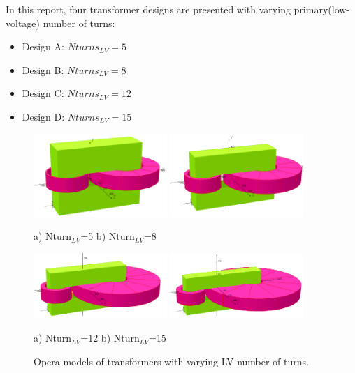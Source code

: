 \documentclass[a4paper, 11pt]{article} %
\begin{document}
In this report, four transformer designs are presented with varying primary(low-voltage) number of turns:

\begin{itemize}
\item Design A: $Nturns_{LV}=5$
\item Design B: $Nturns_{LV}=8$
\item Design C: $Nturns_{LV}=12$
\item Design D: $Nturns_{LV}=15$
\end{itemize}

\begin{figure}[]
  \centering
    \includegraphics[width=0.45\textwidth]{Np5}
    \includegraphics[width=0.45\textwidth]{Np8_pers}

a) Nturn$_{LV}$=5 \hspace{1.1in} b) Nturn$_{LV}$=8

    \includegraphics[width=0.45\textwidth]{N12}
    \includegraphics[width=0.45\textwidth]{N15}

a) Nturn$_{LV}$=12 \hspace{1.1in} b) Nturn$_{LV}$=15

  \caption{Opera models of transformers with varying LV number of turns.}
  \label{trans_images}
\end{figure}
\end{document}
